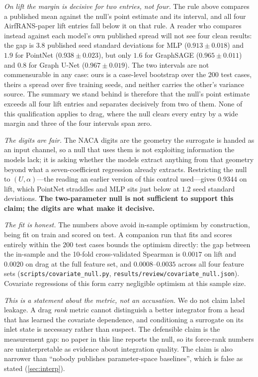 \emph{On lift the margin is decisive for two entries, not four.} The rule above compares a
published mean against the null's point estimate and its interval, and all four
AirfRANS-paper lift entries fall below it on that rule. A reader who compares instead
against each model's own published spread will not see four clean results: the gap is
$3.8$ published seed standard deviations for MLP ($0.913{\pm}0.018$) and $1.9$ for
PointNet ($0.938{\pm}0.023$), but only $1.6$ for GraphSAGE ($0.965{\pm}0.011$) and $0.8$
for Graph U-Net ($0.967{\pm}0.019$). The two intervals are not commensurable in any case:
ours is a case-level bootstrap over the $200$ test cases, theirs a spread over five
training seeds, and neither carries the other's variance source. The summary we stand
behind is therefore that the null's point estimate exceeds all four lift entries and
separates decisively from two of them. None of this qualification applies to drag, where
the null clears every entry by a wide margin and three of the four intervals span zero.

\emph{The digits are fair.} The NACA digits are the geometry the surrogate is handed as
an input channel, so a null that uses them is not exploiting information the models
lack; it is asking whether the models extract anything from that geometry beyond what a
seven-coefficient regression already extracts. Restricting the null to
$(U,\alpha)$---the reading an earlier version of this control used---gives $0.9344$ on
lift, which PointNet straddles and MLP sits just below at $1.2$ seed standard
deviations. \textbf{The two-parameter null is not sufficient to support this claim; the
digits are what make it decisive.}

\emph{The fit is honest.} The numbers above avoid in-sample optimism by construction,
being fit on train and scored on test. A companion run that fits and scores entirely
within the $200$ test cases bounds the optimism directly: the gap between the in-sample
and the 10-fold cross-validated Spearman is $0.0017$ on lift and $0.0020$ on drag at
the full feature set, and $0.0008$--$0.0035$ across all four feature sets
(\texttt{scripts/covariate\_null.py}, \texttt{results/review/covariate\_null.json}).
Covariate regressions of this form carry negligible optimism at this sample size.

\emph{This is a statement about the metric, not an accusation.} We do not claim label
leakage. A drag \emph{rank} metric cannot distinguish a better integrator from a head
that has learned the covariate dependence, and conditioning a surrogate on its inlet
state is necessary rather than suspect. The defensible claim is the measurement gap: no
paper in this line reports the null, so its force-rank numbers are uninterpretable as
evidence about integration quality. The claim is also narrower than ``nobody publishes
parameter-space baselines'', which is false as stated (\autoref{sec:interp}).



